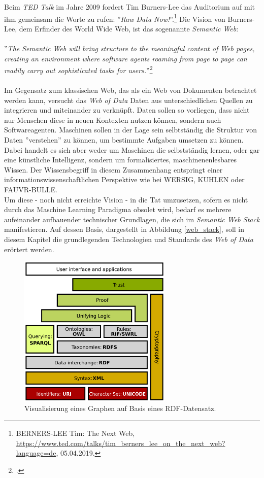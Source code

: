 \documentclass[12pt,a4paper]{article}
\begin{document}
Beim \textit{TED Talk} im Jahre 2009 fordert Tim Burners-Lee das Auditorium auf mit ihm gemeinsam die Worte zu rufen: ''\textit{Raw Data Now!}''.\footnote{BERNERS-LEE Tim: The Next Web, \url{https://www.ted.com/talks/tim_berners_lee_on_the_next_web?language=de}, 05.04.2019.} Die Vision von Burners-Lee, dem Erfinder des World Wide Web, ist das sogenannte \textit{Semantic Web}:
\\
\\
''\textit{The Semantic Web will bring structure to the meaningful content of Web pages, creating an environment where software agents roaming from page to page can readily carry out sophisticated tasks for users.}''\footcite[][S.3]{berners2001semantic}
\\
\\
 Im Gegensatz zum klassischen Web, das als ein Web von Dokumenten betrachtet werden kann, versucht das \textit{Web of Data} Daten aus unterschiedlichen Quellen zu integrieren und miteinander zu verknüpft. Daten sollen so vorliegen, dass nicht nur Menschen diese in neuen Kontexten nutzen können, sondern auch Softwareagenten. Maschinen sollen in der Lage sein selbtständig die Struktur von Daten ''verstehen'' zu können, um bestimmte Aufgaben umsetzen zu können. Dabei handelt es sich aber weder um Maschinen die selbstständig lernen, oder gar eine künstliche Intelligenz, sondern um formalisiertes, maschinenenlesbares Wissen. Der Wissensbegriff in diesem Zusammenhang entspringt einer informationswissenschaftlichen Perspektive wie bei WERSIG, KUHLEN oder FAUVR-BULLE.
\\
Um diese - noch nicht erreichte Vision - in die Tat umzusetzen, sofern es nicht durch das Maschine Learning Paradigma obsolet wird, bedarf es mehrere aufeinander aufbauender technischer Grundlagen, die sich im \textit{Semantic Web Stack} manifestieren. Auf dessen Basis, dargestellt in Abbildung \ref{web_stack}, soll in diesem Kapitel die grundlegenden Technologien und Standards des \textit{Web of Data} erörtert werden.
\begin{figure}[h]
  \centering
	\includegraphics[width=0.65\textwidth]{img/web_stack.png}  
    \caption[Visualisierung eines Graphen auf Basis eines RDF-Datensatz, \protect\url{https://www.w3.org/TR/rdf11-primer/}, 10.04.2019.]{Visualisierung eines Graphen auf Basis eines RDF-Datensatz.}
  	\label{fig:web_stack}
\end{figure}
\end{document}
